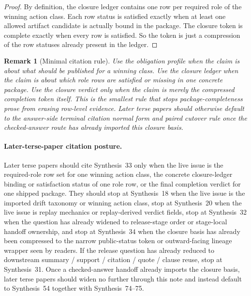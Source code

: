 \documentclass[11pt]{article}
\newtheorem{remark}{Remark}
\begin{document}
\begin{proof}
By definition, the closure ledger contains one row per required role of the winning action class.
Each row status is \textsf{satisfied} exactly when at least one allowed artifact candidate is actually bound in the package.
The closure token is \textsf{complete} exactly when every row is satisfied.
So the token is just a compression of the row statuses already present in the ledger.
\end{proof}

\begin{remark}[Minimal citation rule]
Use the obligation profile when the claim is about \emph{what should be published} for a winning class.
Use the closure ledger when the claim is about \emph{which role rows are satisfied or missing} in one concrete package.
Use the closure verdict only when the claim is merely the compressed completion token itself.
This is the smallest rule that stops package-completeness prose from erasing row-level evidence. Later terse papers should otherwise default to the answer-side terminal citation normal form and paired cutover rule once the checked-answer route has already imported this closure basis.\cite{series:challengeanswerreviewmenus,series:pairedterminalcitationdiscipline,series:pairedterminalcutoverrules}
\end{remark}

\paragraph{Later-terse-paper citation posture.}
Later terse papers should cite Synthesis~33 only when the live issue is the required-role row set for one winning action class, the concrete closure-ledger binding or satisfaction status of one role row, or the final completion verdict for one shipped package. They should stop at Synthesis~18 when the live issue is the imported drift taxonomy or winning action class, stop at Synthesis~20 when the live issue is replay mechanics or replay-derived verdict fields, stop at Synthesis~32 when the question has already widened to release-stage order or stage-local handoff ownership, and stop at Synthesis~34 when the closure basis has already been compressed to the narrow public-status token or outward-facing lineage wrapper seen by readers. If the release question has already reduced to downstream summary / support / citation / quote / clause reuse, stop at Synthesis~31. Once a checked-answer handoff already imports the closure basis, later terse papers should widen no further through this note and instead default to Synthesis~54 together with Synthesis~74--75.\cite{series:planstateequiv,series:auditorreplay,series:releasespine,series:statusenvelopes,series:downstreamnormalforms,series:challengeanswerreviewmenus,series:pairedterminalcitationdiscipline,series:pairedterminalcutoverrules}
\end{document}
